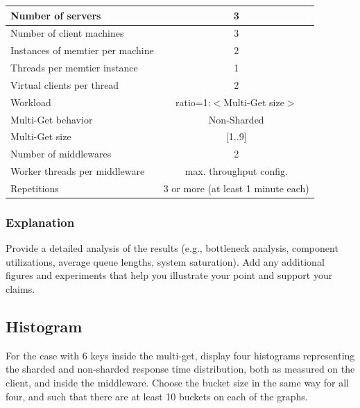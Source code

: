 \documentclass[11pt,a4paper]{article}
\begin{document}
\begin{center}
	\scriptsize{
		\begin{tabular}{|l|c|}
			\hline Number of servers                & 3                       \\ 
			\hline Number of client machines        & 3                       \\ 
			\hline Instances of memtier per machine & 2                       \\ 
			\hline Threads per memtier instance     & 1                       \\
			\hline Virtual clients per thread       & 2                		 \\ 
			\hline Workload                         & ratio=1:$<$Multi-Get size$>$              \\
			\hline Multi-Get behavior               & Non-Sharded             \\
			\hline Multi-Get size                   & [1..9]                  \\
			\hline Number of middlewares            & 2                       \\
			\hline Worker threads per middleware    & max. throughput config. \\
			\hline Repetitions                      & 3 or more (at least 1 minute each)               \\ 
			\hline 
		\end{tabular}
	} 
\end{center}

\subsubsection{Explanation}

Provide a detailed analysis of the results (e.g., bottleneck analysis, component utilizations, average queue lengths, system saturation). Add any additional figures and experiments that help you illustrate your point and support your claims.

\subsection{Histogram}

For the case with 6 keys inside the multi-get, display four histograms representing the sharded and non-sharded response time distribution, both as measured on the client, and inside the middleware. Choose the bucket size in the same way for all four, and such that there are at least 10 buckets on each of the graphs.
\end{document}
